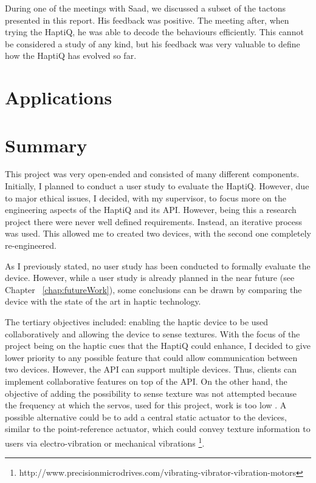 During one of the meetings with Saad, we discussed a subset of the tactons presented in this report. His feedback was positive. The meeting after, when trying the HaptiQ, he was able to decode the behaviours efficiently. This cannot be considered a study of any kind, but his feedback was very valuable to define how the HaptiQ has evolved so far. 

\section{Applications}


\section{Summary}


This project was very open-ended and consisted of many different components. Initially, I planned to conduct a user study to evaluate the HaptiQ. However, due to major ethical issues, I decided, with my supervisor, to focus more on the engineering aspects of the HaptiQ and its API. However, being this a research project there were never well defined requirements. Instead, an iterative process was used. This allowed me to created two devices, with the second one completely re-engineered.   

As I previously stated, no user study has been conducted to formally evaluate the device. However, while a user study is already planned in the near future (see Chapter ~\ref{chap:futureWork}), some conclusions can be drawn by comparing the device with the state of the art in haptic technology. 


The tertiary objectives included: enabling the haptic device to be used collaboratively and allowing the device to sense textures. 
With the focus of the project being on the haptic cues that the HaptiQ could enhance, I decided to give lower priority to any possible feature that could allow communication between two devices. However, the API can support multiple devices. Thus, clients can implement  collaborative features on top of the API.
On the other hand, the objective of adding the possibility to sense texture was not attempted because the frequency at which the servos, used for this project, work is too low \cite{brown2005first}. A possible alternative could be to add a central static actuator to the devices, similar to the point-reference actuator, which could convey texture information to users via electro-vibration \cite{bau2010teslatouch, bau2012revel} or mechanical vibrations \footnote{http://www.precisionmicrodrives.com/vibrating-vibrator-vibration-motors}.   
